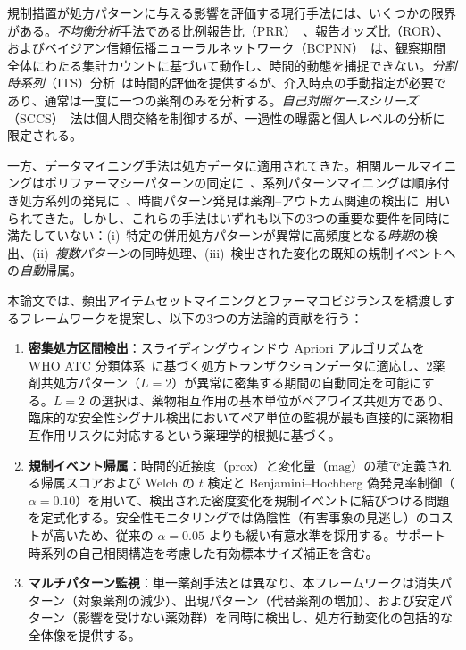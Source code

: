 \documentclass[11pt]{article}
\begin{document}
規制措置が処方パターンに与える影響を評価する現行手法には、いくつかの限界がある。\emph{不均衡分析}手法である比例報告比（PRR）~\citep{evans2001prr}、報告オッズ比（ROR）、およびベイジアン信頼伝播ニューラルネットワーク（BCPNN）~\citep{bate1998bcpnn}は、観察期間全体にわたる集計カウントに基づいて動作し、時間的動態を捕捉できない。\emph{分割時系列}（ITS）分析~\citep{bernal2017its,wagner2002its}は時間的評価を提供するが、介入時点の手動指定が必要であり、通常は一度に一つの薬剤のみを分析する。\emph{自己対照ケースシリーズ}（SCCS）~\citep{whitaker2006sccs,cadarette2021sccs}法は個人間交絡を制御するが、一過性の曝露と個人レベルの分析に限定される。

一方、データマイニング手法は処方データに適用されてきた。相関ルールマイニングはポリファーマシーパターンの同定に~\citep{carvalho2022apriori,pappa2017polypharmacy}、系列パターンマイニングは順序付き処方系列の発見に~\citep{wright2015sequential}、時間パターン発見は薬剤--アウトカム関連の検出に~\citep{noren2010temporal,batal2012temporal}用いられてきた。しかし、これらの手法はいずれも以下の3つの重要な要件を同時に満たしていない：(i)~特定の併用処方パターンが異常に高頻度となる\emph{時期}の検出、(ii)~\emph{複数パターン}の同時処理、(iii)~検出された変化の既知の規制イベントへの\emph{自動}帰属。

本論文では、頻出アイテムセットマイニングとファーマコビジランスを橋渡しするフレームワークを提案し、以下の3つの方法論的貢献を行う：

\begin{enumerate}
    \item \textbf{密集処方区間検出}：スライディングウィンドウ Apriori アルゴリズムを WHO ATC 分類体系~\citep{whoatc2024}に基づく処方トランザクションデータに適応し、2薬剤共処方パターン（$L = 2$）が異常に密集する期間の自動同定を可能にする。$L = 2$ の選択は、薬物相互作用の基本単位がペアワイズ共処方であり、臨床的な安全性シグナル検出においてペア単位の監視が最も直接的に薬物相互作用リスクに対応するという薬理学的根拠に基づく。

    \item \textbf{規制イベント帰属}：時間的近接度（$\mathrm{prox}$）と変化量（$\mathrm{mag}$）の積で定義される帰属スコアおよび Welch の $t$ 検定と Benjamini--Hochberg 偽発見率制御（$\alpha = 0.10$）を用いて、検出された密度変化を規制イベントに結びつける問題を定式化する。安全性モニタリングでは偽陰性（有害事象の見逃し）のコストが高いため、従来の $\alpha = 0.05$ よりも緩い有意水準を採用する。サポート時系列の自己相関構造を考慮した有効標本サイズ補正を含む。

    \item \textbf{マルチパターン監視}：単一薬剤手法とは異なり、本フレームワークは消失パターン（対象薬剤の減少）、出現パターン（代替薬剤の増加）、および安定パターン（影響を受けない薬効群）を同時に検出し、処方行動変化の包括的な全体像を提供する。
\end{enumerate}
\end{document}
